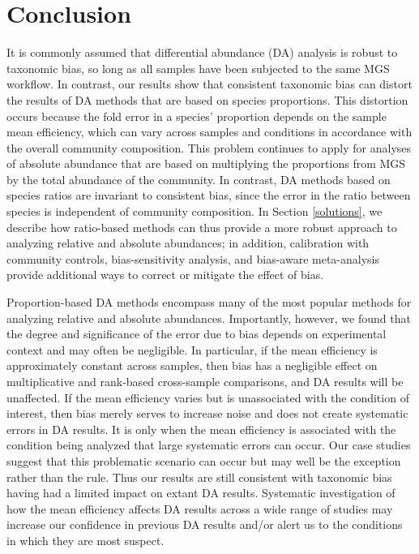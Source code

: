 \documentclass[
]{article}
\begin{document}
\hypertarget{conclusion}{%
\section{Conclusion}\label{conclusion}}

It is commonly assumed that differential abundance (DA) analysis is robust to taxonomic bias, so long as all samples have been subjected to the same MGS workflow.
In contrast, our results show that consistent taxonomic bias can distort the results of DA methods that are based on species proportions.
This distortion occurs because the fold error in a species' proportion depends on the sample mean efficiency, which can vary across samples and conditions in accordance with the overall community composition.
This problem continues to apply for analyses of absolute abundance that are based on multiplying the proportions from MGS by the total abundance of the community.
In contrast, DA methods based on species ratios are invariant to consistent bias, since the error in the ratio between species is independent of community composition.
In Section \ref{solutions}, we describe how ratio-based methods can thus provide a more robust approach to analyzing relative and absolute abundances;
in addition, calibration with community controls, bias-sensitivity analysis, and bias-aware meta-analysis provide additional ways to correct or mitigate the effect of bias.

Proportion-based DA methods encompass many of the most popular methods for analyzing relative and absolute abundances.
Importantly, however, we found that the degree and significance of the error due to bias depends on experimental context and may often be negligible.
In particular, if the mean efficiency is approximately constant across samples, then bias has a negligible effect on multiplicative and rank-based cross-sample comparisons, and DA results will be unaffected.
If the mean efficiency varies but is unassociated with the condition of interest, then bias merely serves to increase noise and does not create systematic errors in DA results.
It is only when the mean efficiency is associated with the condition being analyzed that large systematic errors can occur.
Our case studies suggest that this problematic scenario can occur but may well be the exception rather than the rule.
Thus our results are still consistent with taxonomic bias having had a limited impact on extant DA results.
Systematic investigation of how the mean efficiency affects DA results across a wide range of studies may increase our confidence in previous DA results and/or alert us to the conditions in which they are most suspect.
\end{document}
